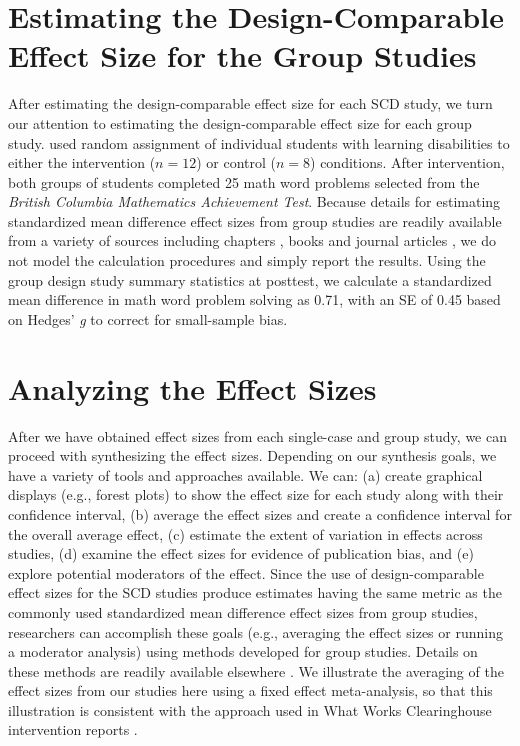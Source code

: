 \documentclass[
]{book}
\begin{document}
\hypertarget{estimating-the-design-comparable-effect-size-for-the-group-studies}{%
\section{Estimating the Design-Comparable Effect Size for the Group Studies}\label{estimating-the-design-comparable-effect-size-for-the-group-studies}}

After estimating the design-comparable effect size for each SCD study, we turn our attention to estimating the design-comparable effect size for each group study. \citet{hutchinson1993Effects} used random assignment of individual students with learning disabilities to either the intervention (\(n = 12\)) or control (\(n = 8\)) conditions. After intervention, both groups of students completed 25 math word problems selected from the \emph{British Columbia Mathematics Achievement Test}. Because details for estimating standardized mean difference effect sizes from group studies are readily available from a variety of sources including chapters \citep{Borenstein2019effect}, books \citep[e.g.,][]{borenstein2021introduction} and journal articles \citep[e.g.,][]{Hedges2007effect, Hedges1981distribution}, we do not model the calculation procedures and simply report the results. Using the \citet{hutchinson1993Effects} group design study summary statistics at posttest, we calculate a standardized mean difference in math word problem solving as 0.71, with an SE of 0.45 based on Hedges' \emph{g} to correct for small-sample bias.

\hypertarget{analyzing-the-effect-sizes}{%
\section{Analyzing the Effect Sizes}\label{analyzing-the-effect-sizes}}

After we have obtained effect sizes from each single-case and group study, we can proceed with synthesizing the effect sizes. Depending on our synthesis goals, we have a variety of tools and approaches available. We can: (a) create graphical displays (e.g., forest plots) to show the effect size for each study along with their confidence interval, (b) average the effect sizes and create a confidence interval for the overall average effect, (c) estimate the extent of variation in effects across studies, (d) examine the effect sizes for evidence of publication bias, and (e) explore potential moderators of the effect. Since the use of design-comparable effect sizes for the SCD studies produce estimates having the same metric as the commonly used standardized mean difference effect sizes from group studies, researchers can accomplish these goals (e.g., averaging the effect sizes or running a moderator analysis) using methods developed for group studies. Details on these methods are readily available elsewhere \citep[e.g.,][]{borenstein2021introduction, cooper2019handbook}. We illustrate the averaging of the effect sizes from our studies here using a fixed effect meta-analysis, so that this illustration is consistent with the approach used in What Works Clearinghouse intervention reports \citep{whatworksclearinghouse2020What}.
\end{document}
